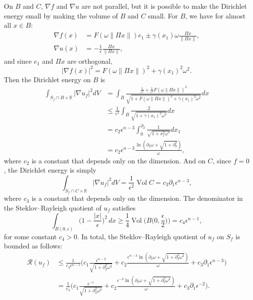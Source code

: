 \documentclass{CUP-JNL-FMP}%
\theoremstyle{definition}
\numberwithin{equation}{section}
\begin{document}
On $B$ and $C$, $\nabla f$ and $\nabla u$ are not parallel, but
it is possible to make the Dirichlet energy small by making
the volume of $B$ and $C$ small.
For $B$, we have for almost all $x \in B$:
\begin{align}\label{eq:nablafonB}
  \nabla f(x) &= F(\omega \|\Pi x\|) e_1 \pm \gamma(x_1) \omega
                \frac{\Pi x}{\|\Pi x\|}, \\
  \nabla u(x) &= -\frac{1}{\epsilon} \frac{\Pi x}{\|\Pi x\|},
\end{align}
and since $e_1$ and $\Pi x$ are orthogonal,
\begin{equation*}
  |\nabla f(x)|^2 = F(\omega \|\Pi x\|)^2 + \gamma(x_1)^2 \omega^2.
\end{equation*}
Then the Dirichlet energy on $B$ is
\begin{align*}
  \int_{S_f \cap B \times \mathbb{R}} |\nabla u_f|^2 dV
  &= \int_B \frac{\frac{1}{\epsilon^2} + \frac{1}{\epsilon^2}
    F(\omega \|\Pi x\|)^2}
    {\sqrt{1 + F(\omega \|\Pi x\|)^2 + \gamma(x_1)^2 \omega^2}}
    dx\\
  &\leq \frac{1}{\epsilon^2}
    \int_B \frac{2}{\sqrt{1 + \gamma(x_1)^2 \omega^2}} dx \\
  &= c_2 \epsilon^{n-3}
    \int_0^{\partial_2} \frac{1}{\sqrt{1 + x_1^2 \omega^2}} dx_1 \\
  &= c_2 \epsilon^{n-3}
    \frac{\ln(\partial_2 \omega + \sqrt{1 + \partial_2^2})}{\omega},
\end{align*}
where $c_2$ is a constant that depends only on the dimension.
And on $C$, since $f=0$, the Dirichlet energy is simply
\begin{equation*}
  \int_{S_f \cap C \times \mathbb{R}} |\nabla u_f|^2 dV = \frac{1}{\epsilon^2} \mathop{\mbox{Vol}} C
  = c_3 \partial_1 \epsilon^{n-3},
\end{equation*}
where $c_3$ is a constant that depends only on the dimension.
The denominator in the Steklov--Rayleigh quotient of $u_f$ satisfies
 $$\int_{B(0,\epsilon)}\Big(1-\frac{|x|}{\epsilon}\Big)^2\,dx\geq\frac{1}{4}\mathop{\mbox{Vol}}
 \Big({B\Big(0,\frac{\epsilon}{2}\Big)}\Big)=c_4\epsilon^{n-1},$$
for some constant $c_4>0$.
In total, the Steklov--Rayleigh quotient of $u_f$ on $S_f$ is bounded as follows:
\begin{align*}
  \mathcal{R}(u_f)
  &\leq \frac{1}{c_4\epsilon^{n-1}}
    \Big(c_1 \frac{\epsilon^{n-2}}{\sqrt{1 + \partial_2^2 \omega^2}}
    + c_2 \frac{\epsilon^{n-3} \ln(\partial_2 \omega +
    \sqrt{1 + \partial_2^2 \omega^2})}{\omega}
    + c_3 \partial_1 \epsilon^{n-3} \Big)\\
  &= \frac{1}{c_4}\Big(c_1 \frac{\epsilon^{-1}}{\sqrt{1 + \partial_2^2 \omega^2}}
    + c_2 \frac{\epsilon^{-2} \ln(\partial_2 \omega + \sqrt{1 +
    \partial_2^2 \omega^2})}{\omega}
    + c_3 \partial_1 \epsilon^{-2}\Big).
\end{align*}
\end{document}
